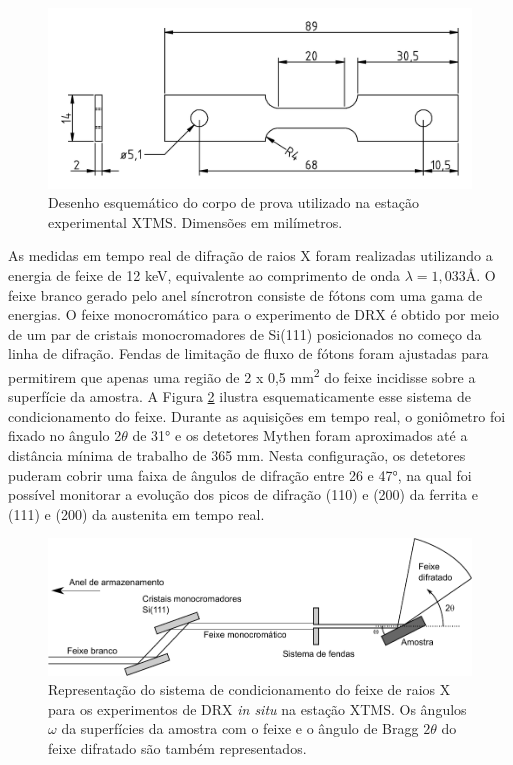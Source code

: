 \begin{figure}
  \includegraphics[width=.9\textwidth]{img/CPXTMS.pdf}
  \caption{Desenho esquemático do corpo de prova utilizado na estação experimental XTMS. Dimensões em  milímetros.}
  \label{fig:CPXTMS}
\end{figure}

As medidas em tempo real de difração de raios X foram realizadas utilizando a energia de feixe de 12 keV, equivalente ao comprimento de onda $\lambda = 1,033\text{\AA}$. O feixe branco gerado pelo anel síncrotron consiste de fótons com uma gama de energias. O feixe monocromático para o experimento de DRX é obtido por meio de um par de cristais monocromadores de Si(111) posicionados no começo da linha de difração. Fendas de limitação de fluxo de fótons foram ajustadas para permitirem que apenas uma região de 2 x 0,5 mm\textsuperscript{2} do feixe incidisse sobre a superfície da amostra. A Figura \ref{fig:esqXRD1} ilustra esquematicamente esse sistema de condicionamento do feixe. Durante as aquisições em tempo real, o goniômetro foi fixado no ângulo 2$\theta$ de 31° e os detetores Mythen foram aproximados até a distância mínima de trabalho de 365 mm. Nesta configuração, os detetores puderam cobrir uma faixa de ângulos de difração entre 26 e 47°, na qual foi possível monitorar a evolução dos picos de difração (110) e (200) da ferrita e (111) e (200) da austenita em tempo real. 

\begin{figure}
  \includegraphics[width=\textwidth]{img/XRD1.pdf}
  \caption{Representação do sistema de condicionamento do feixe de raios X para os experimentos de DRX \textit{in situ} na estação XTMS. Os ângulos $\omega$ da superfícies da amostra com o feixe e o ângulo de Bragg $2\theta$ do feixe difratado são também representados.}
  \label{fig:esqXRD1}
\end{figure}


